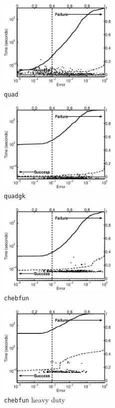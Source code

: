 \documentclass[graybox]{svmult}
\begin{document}
\begin{figure}
\centering
\begin{minipage}{5.7cm} \centering \includegraphics[width=5.7cm]{gaussiand=1quadErrTime.eps} \\ {\tt quad} \end{minipage}
\begin{minipage}{5.7cm} \centering \includegraphics[width=5.7cm]{gaussiand=1quadgkErrTime.eps} \\ {\tt quadgk} \end{minipage}
\begin{minipage}{5.7cm} \centering \includegraphics[width=5.7cm]{gaussiand=1chebfunErrTime.eps} \\ {\tt chebfun} \end{minipage}
\begin{minipage}{5.7cm} \centering \includegraphics[width=5.7cm]{gaussiand=1chebfunheavyErrTime.eps} \\ {\tt chebfun}  heavy duty\end{minipage}

\end{figure}
\end{document}

